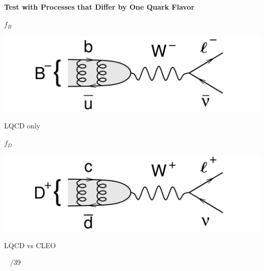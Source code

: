 \documentclass[landscape]{article}
\newenvironment{slide}[1][ ]{}{\mbox{ } \hfill \arabic{page}/39 \pagebreak}
\begin{document}
\begin{slide}
{\Huge \bf Test with Processes that Differ by One Quark Flavor}

\vfill
\begin{minipage}{0.27\linewidth} \begin{center} {\Huge \boldmath $f_B$} \end{center} \end{minipage} \hfill \begin{minipage}{10 cm} \includegraphics[width=\linewidth]{diagram_Btolnu} \end{minipage} \hfill \begin{minipage}{0.3\linewidth} \begin{center} LQCD only \end{center} \end{minipage}

\vfill
\begin{minipage}{0.27\linewidth} \begin{center} {\Huge \boldmath $f_D$} \end{center} \end{minipage} \hfill \begin{minipage}{10 cm} \includegraphics[width=\linewidth]{diagram_Dtolnu} \end{minipage} \hfill \begin{minipage}{0.3\linewidth} \begin{center} LQCD vs CLEO \end{center} \end{minipage}


\end{slide}
\end{document}
